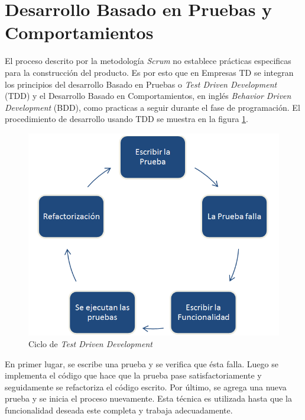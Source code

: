\section{Desarrollo Basado en Pruebas y Comportamientos} \label{sect:TDD_BDD}

El proceso descrito por la metodología \textit{Scrum} no establece prácticas especificas para la construcción del producto. Es por esto que en Empresas TD se integran los principios del desarrollo Basado en Pruebas o \textit{Test Driven Development} (TDD)  y el Desarrollo Basado en Comportamientos, en inglés \textit{Behavior Driven Development} (BDD), como practicas a seguir durante el fase de programación. El procedimiento de desarrollo usando TDD se muestra en la figura \ref{img:tdd}.

\begin{figure}[h]
	\begin{center}
		\includegraphics[scale=0.55]{imagenes/tdd.png}
	\end{center}
	\caption{
		\label{img:tdd}
		Ciclo de \textit{Test Driven Development}
	}
\end{figure}

En primer lugar, se escribe una prueba y se verifica que ésta falla. Luego se implementa el código que hace que la prueba pase satisfactoriamente y seguidamente se refactoriza el código escrito. Por último, se agrega una nueva prueba y se inicia el proceso nuevamente. Esta técnica es utilizada hasta que la funcionalidad deseada este completa y trabaja adecuadamente. 

